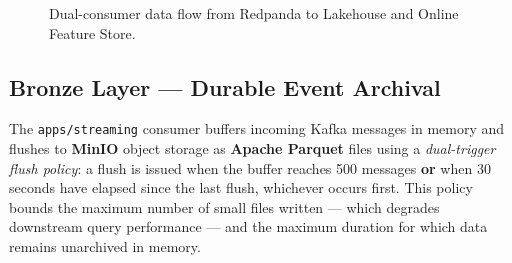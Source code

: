 \begin{figure}[h]
{%
      }
      \caption{Dual-consumer data flow from Redpanda to Lakehouse and
      Online Feature Store.}                                                                                                                              
      \label{fig:data_flow}
  \end{figure}                                                                                                                                            
                  
  \subsection{Bronze Layer — Durable Event Archival}
  \label{subsec:bronze}
   
  The \texttt{apps/streaming} consumer buffers incoming Kafka messages in                                                                                 
  memory and flushes to \textbf{MinIO} object storage as \textbf{Apache
  Parquet} \cite{parquet_format} files using a \textit{dual-trigger flush                                                                                 
  policy}: a flush is issued when the buffer reaches 500 messages                                                                                         
  \textbf{or} when 30 seconds have elapsed since the last flush, whichever                                                                                
  occurs first. This policy bounds the maximum number of small files                                                                                      
  written — which degrades downstream query performance \cite{small_file_problem}                                                                         
  — and the maximum duration for which data remains unarchived in memory.                                                                                 
                                                                                                                                                          
